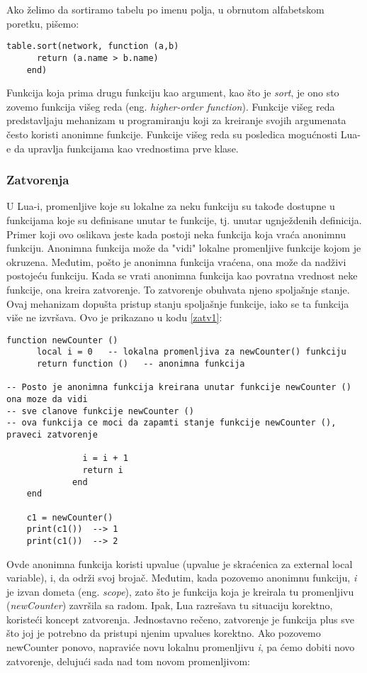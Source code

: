 \documentclass[a4paper]{article}
\begin{document}
Ako želimo da sortiramo tabelu po imenu polja, u obrnutom alfabetskom poretku, pišemo:
\begin{lstlisting}[caption={Sortiranje tabele},frame=single, label=fun3]
    table.sort(network, function (a,b)
      return (a.name > b.name)
    end)
\end{lstlisting}
Funkcija koja prima drugu funkciju kao argument, kao što je \textit{sort}, je ono sto zovemo funkcija višeg reda (eng. \textit{higher-order function}). Funkcije višeg reda predstavljaju mehanizam u programiranju koji za kreiranje svojih argumenata često koristi anonimne funkcije. Funkcije višeg reda su posledica mogućnosti Lua-e da upravlja funkcijama kao vrednostima prve klase.

\subsubsection*{Zatvorenja}
U Lua-i, promenljive koje su lokalne za neku funkciju su takođe dostupne u funkcijama koje su definisane unutar te funkcije, tj. unutar ugnježdenih definicija. Primer koji ovo oslikava jeste kada postoji neka funkcija koja vraća anonimnu funkciju. Anonimna funkcija može da "vidi" lokalne promenljive funkcije kojom je okruzena. Međutim, pošto je anonimna funkcija vraćena, ona može da nadživi postojeću funkciju. Kada se vrati anonimna funkcija kao povratna vrednost neke funkcije, ona kreira zatvorenje. To zatvorenje obuhvata njeno spoljašnje stanje. Ovaj mehanizam dopušta pristup stanju spoljašnje funkcije, iako se ta funkcija više ne izvršava. Ovo je prikazano u kodu \ref{zatv1}:
\begin{lstlisting}[caption={Primer zatvorenja},frame=single, label=zatv1]
function newCounter ()
      local i = 0	-- lokalna promenljiva za newCounter() funkciju
      return function ()   -- anonimna funkcija

-- Posto je anonimna funkcija kreirana unutar funkcije newCounter () ona moze da vidi
-- sve clanove funkcije newCounter ()
-- ova funkcija ce moci da zapamti stanje funkcije newCounter (), praveci zatvorenje

               i = i + 1
               return i
             end
    end
    
    c1 = newCounter()
    print(c1())  --> 1
    print(c1())  --> 2
\end{lstlisting}
Ovde anonimna funkcija koristi upvalue (upvalue je skraćenica za external local variable), i, da održi svoj brojač. Međutim, kada pozovemo anonimnu funkciju, \textit{i} je izvan dometa (eng. \textit{scope}), zato što je funkcija koja je kreirala tu promenljivu (\textit{newCounter}) završila sa radom. Ipak, Lua razrešava tu situaciju korektno, koristeći koncept zatvorenja. Jednostavno rečeno, zatvorenje je funkcija plus sve što joj je potrebno da pristupi njenim upvalues korektno. Ako pozovemo newCounter ponovo, napraviće novu lokalnu promenljivu \textit{i}, pa ćemo dobiti novo zatvorenje, delujući sada nad tom novom promenljivom:
\end{document}
